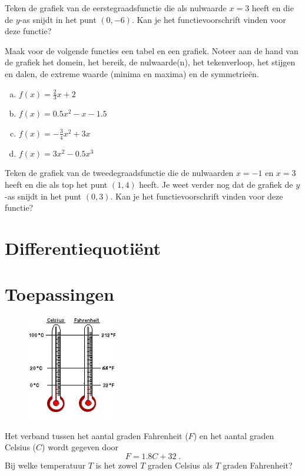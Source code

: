 \documentclass[12pt]{article}
\begin{document}
\begin{oefening}
Teken de grafiek van de eerstegraadsfunctie die als nulwaarde $x=3$ heeft en die de $y$-as snijdt in het punt $(0,-6)$. Kan je het functievoorschrift vinden voor deze functie?
\end{oefening}

\begin{oefening}
Maak voor de volgende functies een tabel en een grafiek. Noteer aan de hand van de grafiek het domein, het bereik, de nulwaarde(n), het tekenverloop, het stijgen en dalen, de extreme waarde (minima en maxima) en de symmetrieën.
\begin{enumerate}[(a)]
  \item $f(x)=\frac{2}{3}x+2$
  \item $f(x)=0.5x^2-x-1.5$
  \item $f(x)=-\frac{3}{4}x^2+3x$
  \item $f(x)=3x^2-0.5x^3$
\end{enumerate}
\end{oefening}

\begin{oefening}
Teken de grafiek van de tweedegraadsfunctie die de nulwaarden $x=-1$ en $x=3$ heeft en die als top het punt $(1,4)$ heeft. Je weet verder nog dat de grafiek de $y$-as snijdt in het punt $(0,3)$. Kan je het functievoorschrift vinden voor deze functie?
\end{oefening}

\newpage
\section{Differentiequotiënt}

\newpage
\section{Toepassingen}

\begin{oefening}
\begin{figure}
\vspace*{-1.75cm}
\begin{center}
  \includegraphics[width=4cm]{CelsiusFahrenheitThermo}
\end{center}
\end{figure}
Het verband tussen het aantal graden Fahrenheit ($F$) en het aantal graden Celsius ($C$) wordt gegeven door$$F=1.8C+32\;.$$
Bij welke temperatuur $T$ is het zowel $T$ graden Celsius als $T$ graden Fahrenheit?
\end{oefening}
\end{document}
